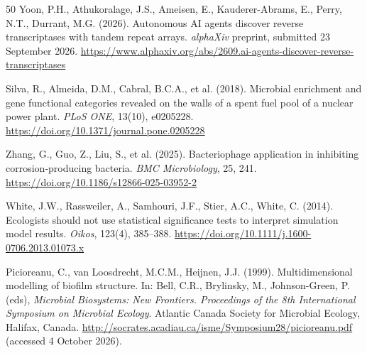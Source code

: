 \documentclass[11pt]{article}
\begin{document}
\begin{thebibliography}{50}
Yoon, P.H., Athukoralage, J.S., Ameisen, E., Kauderer-Abrams, E., Perry, N.T., Durrant, M.G.
(2026).
Autonomous AI agents discover reverse transcriptases with tandem repeat arrays.
\textit{alphaXiv} preprint, submitted 23 September 2026.
\url{https://www.alphaxiv.org/abs/2609.ai-agents-discover-reverse-transcriptases}

Silva, R., Almeida, D.M., Cabral, B.C.A., et al. (2018).
Microbial enrichment and gene functional categories revealed on the walls of a spent fuel pool of
a nuclear power plant.
\textit{PLoS ONE}, 13(10), e0205228.
\url{https://doi.org/10.1371/journal.pone.0205228}

Zhang, G., Guo, Z., Liu, S., et al. (2025).
Bacteriophage application in inhibiting corrosion-producing bacteria.
\textit{BMC Microbiology}, 25, 241.
\url{https://doi.org/10.1186/s12866-025-03952-2}

White, J.W., Rassweiler, A., Samhouri, J.F., Stier, A.C., White, C. (2014).
Ecologists should not use statistical significance tests to interpret simulation model results.
\textit{Oikos}, 123(4), 385--388.
\url{https://doi.org/10.1111/j.1600-0706.2013.01073.x}

Picioreanu, C., van Loosdrecht, M.C.M., Heijnen, J.J. (1999).
Multidimensional modelling of biofilm structure.
In: Bell, C.R., Brylinsky, M., Johnson-Green, P. (eds), \textit{Microbial Biosystems: New
Frontiers. Proceedings of the 8th International Symposium on Microbial Ecology}. Atlantic Canada
Society for Microbial Ecology, Halifax, Canada.
\url{http://socrates.acadiau.ca/isme/Symposium28/picioreanu.pdf} (accessed 4 October 2026).

\end{thebibliography}
\end{document}
